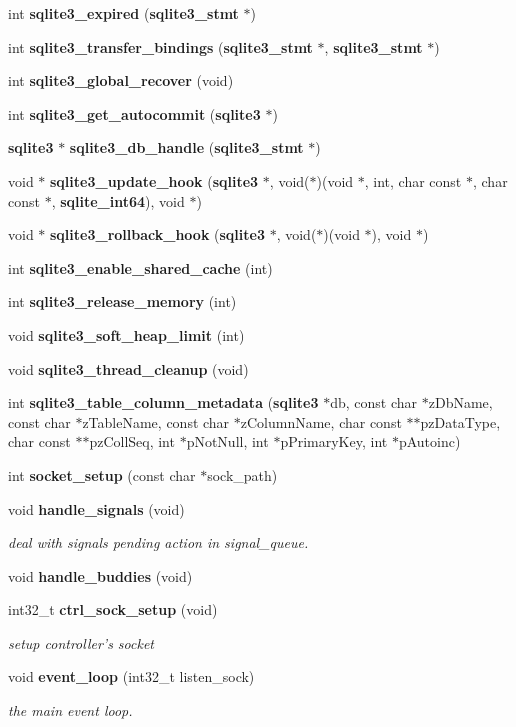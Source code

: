 \begin{DoxyCompactItemize}
\item 
int {\bf sqlite3\_\-expired} ({\bf sqlite3\_\-stmt} $\ast$)
\item 
int {\bf sqlite3\_\-transfer\_\-bindings} ({\bf sqlite3\_\-stmt} $\ast$, {\bf sqlite3\_\-stmt} $\ast$)
\item 
int {\bf sqlite3\_\-global\_\-recover} (void)
\item 
int {\bf sqlite3\_\-get\_\-autocommit} ({\bf sqlite3} $\ast$)
\item 
{\bf sqlite3} $\ast$ {\bf sqlite3\_\-db\_\-handle} ({\bf sqlite3\_\-stmt} $\ast$)
\item 
void $\ast$ {\bf sqlite3\_\-update\_\-hook} ({\bf sqlite3} $\ast$, void($\ast$)(void $\ast$, int, char const $\ast$, char const $\ast$, {\bf sqlite\_\-int64}), void $\ast$)
\item 
void $\ast$ {\bf sqlite3\_\-rollback\_\-hook} ({\bf sqlite3} $\ast$, void($\ast$)(void $\ast$), void $\ast$)
\item 
int {\bf sqlite3\_\-enable\_\-shared\_\-cache} (int)
\item 
int {\bf sqlite3\_\-release\_\-memory} (int)
\item 
void {\bf sqlite3\_\-soft\_\-heap\_\-limit} (int)
\item 
void {\bf sqlite3\_\-thread\_\-cleanup} (void)
\item 
int {\bf sqlite3\_\-table\_\-column\_\-metadata} ({\bf sqlite3} $\ast$db, const char $\ast$zDbName, const char $\ast$zTableName, const char $\ast$zColumnName, char const $\ast$$\ast$pzDataType, char const $\ast$$\ast$pzCollSeq, int $\ast$pNotNull, int $\ast$pPrimaryKey, int $\ast$pAutoinc)
\item 
int {\bf socket\_\-setup} (const char $\ast$sock\_\-path)
\item 
void {\bf handle\_\-signals} (void)
\begin{DoxyCompactList}\small\item\em deal with signals pending action in signal\_\-queue. \end{DoxyCompactList}\item 
void {\bf handle\_\-buddies} (void)
\item 
int32\_\-t {\bf ctrl\_\-sock\_\-setup} (void)
\begin{DoxyCompactList}\small\item\em setup controller's socket \end{DoxyCompactList}\item 
void {\bf event\_\-loop} (int32\_\-t listen\_\-sock)
\begin{DoxyCompactList}\small\item\em the main event loop. \end{DoxyCompactList}\item 

\end{DoxyCompactItemize}
